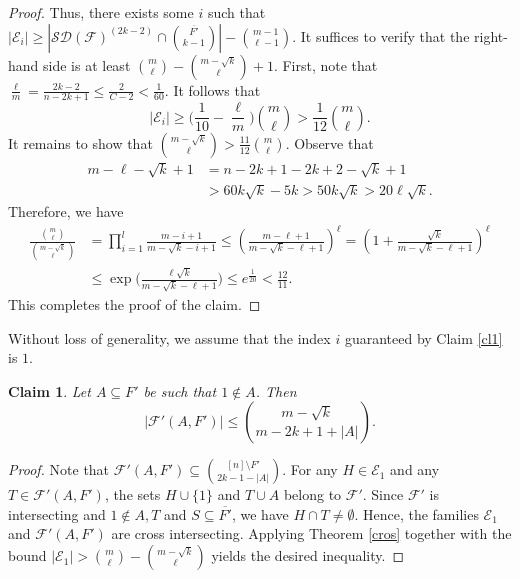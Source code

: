 \documentclass[11pt]{article}
\numberwithin{equation}{section}
\newtheorem{claim}{Claim}[section]
\begin{document}
\begin{proof}
		Thus, there exists some $i$ such that $|\mathcal{E}_i| \geq |\mathcal{SD}(\mathcal{F})^{(2k-2)} \cap \binom{\overline{F'}}{k-1}| - \binom{m-1}{\ell-1}$. 
		It suffices to verify that the right-hand side is at least $\binom{m}{\ell} - \binom{m-\sqrt{k}}{\ell}+1$. First, note that
		$\frac{\ell}{m}=\frac{2k-2}{n-2k+1}\le\frac{2}{C-2}<\frac{1}{60}$.
         It follows that
		$$
		|\mathcal{E}_i| \geq \biggl( \frac{1}{10} - \frac{\ell}{m} \biggr) \binom{m}{\ell} > \frac{1}{12} \binom{m}{\ell}.
		$$
		It remains to show that $\binom{m-\sqrt{k}}{\ell} > \frac{11}{12} \binom{m}{\ell}$. Observe that
		\begin{align*}
			m - \ell - \sqrt{k} + 1 &= n-2k+1-2k+2-\sqrt{k}+1\\
&>60k\sqrt{k}-5k>50k\sqrt{k}>20\ell \sqrt{k}. 
		\end{align*}
		Therefore, we have
		\begin{align*}
			\frac{\binom{m}{\ell}}{\binom{m-\sqrt{k}}{\ell}}&=\prod_{i=1}^{l} \frac{m-i+1}{m-\sqrt{k}-i+1}
\le \left(\frac{m-\ell+1}{m-\sqrt{k}-\ell+1}\right)^\ell
= \left(1+\frac{\sqrt{k}}{m - \sqrt{k} - \ell + 1}\right)^\ell \\
&\le \exp\biggl( \frac{\ell \sqrt{k}}{m - \sqrt{k} - \ell + 1} \biggr)
\le e^{\frac{1}{20}}<\frac{12}{11}.
		\end{align*}
		This completes the proof of the claim.
	\end{proof}

Without loss of generality, we assume that the index $i$ guaranteed by Claim \ref{cl1} is $1$.

\begin{claim}\label{cl2}
Let $A \subseteq F'$ be such that $1 \notin A$. Then
\[
|\mathcal{F}'(A, F')| \le \binom{m - \sqrt{k}}{m - 2k + 1 + |A|}.
\]
\end{claim}

\begin{proof}
Note that $\mathcal{F}'(A, F') \subseteq \binom{[n] \setminus F'}{2k-1-|A|}$. For any $H \in \mathcal{E}_1$ and any $T \in \mathcal{F}'(A, F')$, the sets $H \cup \{1\}$ and $T \cup A$ belong to $\mathcal{F}'$. Since $\mathcal{F}'$ is intersecting and $1 \notin A, T$ and $S\subseteq \overline{F'}$, we have $H\cap T\neq \emptyset$.
Hence, the families $\mathcal{E}_1$ and $\mathcal{F}'(A, F')$ are cross intersecting. Applying Theorem \ref{cros} together with the bound $|\mathcal{E}_1| > \binom{m}{\ell} - \binom{m - \sqrt{k}}{\ell}$ yields the desired inequality.
\end{proof}
\end{document}
